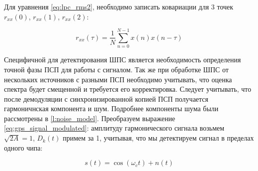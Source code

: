 Для уравнения \ref{eq:lpc_rms2}, необходимо записать ковариации для 3 точек
${r_{xx}(0)}$, ${r_{xx}(1)}$, ${r_{xx}(2)}$:

\begin{center}
\begin{equation}
	\label{eq:lpc_cov}
	{r_{xx}(\tau) = \frac{1}{N} \sum \limits_{n=0}^{N-1} x(n) x(n-\tau)}
\end{equation}
\end{center}

Специфичной для детектирования ШПС является необходимость определения точной фазы ПСП
для работы с сигналом. Так же при обработке ШПС от нескольких источников с разными ПСП необходимо учитывать,
что оценка спектра будет смещенной и требуется его корректировка. Следует учитывать, что после демодуляции
с синхронизированной копией ПСП получается гармоничнская компонента и шум. Подробнее компоненты шума были
рассмотрены в \ref{l:noise_model}. Преобразуем выражение \ref{eq:gps_signal_modulated}: амплитуду гармонического
сигнала возьмем ${\sqrt{2A} = 1}$, ${D_k(t)}$ примем за 1, учитывая, что мы детектируем сигнал в пределах одного
чипа:
\begin{center}
\begin{equation}
	\label{eq:lpc_signal}
	s(t) = \cos(\omega_{c}t) + n(t)
\end{equation}
\end{center}

\newpage
